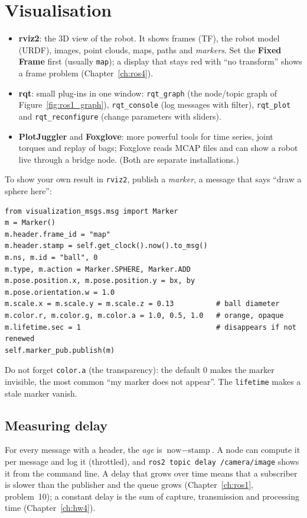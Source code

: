 \section*{Visualisation}
\begin{itemize}[nosep]
\item \textbf{rviz2}: the 3D view of the robot. It shows frames (TF), the robot model (URDF), images, point clouds, maps, paths and \emph{markers}. Set the \textbf{Fixed Frame} first (usually \verb!map!); a display that stays red with ``no transform'' shows a frame problem (Chapter~\ref{ch:ros4}).
\item \textbf{rqt}: small plug-ins in one window: \verb!rqt_graph! (the node/topic graph of Figure~\ref{fig:ros1_graph}), \verb!rqt_console! (log messages with filter), \verb!rqt_plot! and \verb!rqt_reconfigure! (change parameters with sliders).
\item \textbf{PlotJuggler} and \textbf{Foxglove}: more powerful tools for time series, joint torques and replay of bags; Foxglove reads MCAP files and can show a robot live through a bridge node. (Both are separate installations.)
\end{itemize}
To show your own result in \verb!rviz2!, publish a \emph{marker}, a message that says ``draw a sphere here'':
\begin{verbatim}
from visualization_msgs.msg import Marker
m = Marker()
m.header.frame_id = "map"
m.header.stamp = self.get_clock().now().to_msg()
m.ns, m.id = "ball", 0
m.type, m.action = Marker.SPHERE, Marker.ADD
m.pose.position.x, m.pose.position.y = bx, by
m.pose.orientation.w = 1.0
m.scale.x = m.scale.y = m.scale.z = 0.13          # ball diameter
m.color.r, m.color.g, m.color.a = 1.0, 0.5, 1.0   # orange, opaque
m.lifetime.sec = 1                                # disappears if not renewed
self.marker_pub.publish(m)
\end{verbatim}
Do not forget \verb!color.a! (the transparency): the default $0$ makes the marker invisible, the most common ``my marker does not appear''. The \verb!lifetime! makes a stale marker vanish.

\subsection*{Measuring delay}
For every message with a header, the \emph{age} is $\text{now}-\text{stamp}$. A node can compute it per message and log it (throttled), and \verb!ros2 topic delay /camera/image! shows it from the command line. A delay that grows over time means that a subscriber is slower than the publisher and the queue grows (Chapter~\ref{ch:ros1}, problem~10); a constant delay is the sum of capture, transmission and processing time (Chapter~\ref{ch:hw4}).

